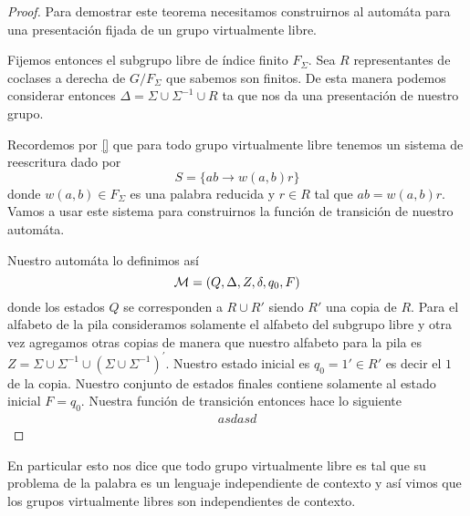 \documentclass[tesis.tex]{subfiles}
\begin{document}
\begin{proof}
	Para demostrar este teorema necesitamos construirnos al automáta para una presentación fijada de un grupo virtualmente libre.
	
	Fijemos entonces el subgrupo libre de índice finito $F_\Sigma$. Sea $R$ representantes de coclases a derecha de $G/F_\Sigma$ que sabemos son finitos. De esta manera podemos considerar entonces $\Delta = \Sigma \cup \Sigma^{-1} \cup R$ ta que nos da una presentación de nuestro grupo.
	
	Recordemos por \ref{} que para todo grupo virtualmente libre tenemos un sistema de reescritura dado por 
	\[
	S = \{ ab \to w(a,b)r  \}
	\] 
	donde $w(a,b) \in F_\Sigma$ es una palabra reducida y $r \in R$ tal que $ab = w(a,b)r$. Vamos a usar este sistema para construirnos la función de transición de nuestro automáta. 
	
	Nuestro automáta lo definimos así 
	\[
	{\cal M }= (Q,\Delta, Z, \delta, q_0, F)
	\]
	donde los estados $Q$ se corresponden a $R \cup R'$ siendo $R'$ una copia de $R$. Para el alfabeto de la pila consideramos solamente el alfabeto del subgrupo libre y otra vez agregamos otras copias de manera que nuestro alfabeto para la pila es $Z = \Sigma \cup \Sigma^{-1} \cup (\Sigma \cup \Sigma^{-1})^{'}$. Nuestro estado inicial es $q_0 = 1' \in R'$ es decir el $1$ de la copia. Nuestro conjunto de estados finales contiene solamente al estado inicial $F=q_0$. Nuestra función de transición entonces hace lo siguiente
	\begin{align*}
		asdasd
	\end{align*}
\end{proof}

\begin{obs}
	En particular esto nos dice que todo grupo virtualmente libre es tal que su problema de la palabra es un lenguaje independiente de contexto y así vimos que los grupos virtualmente libres son independientes de contexto.
\end{obs}

	
\end{document}
